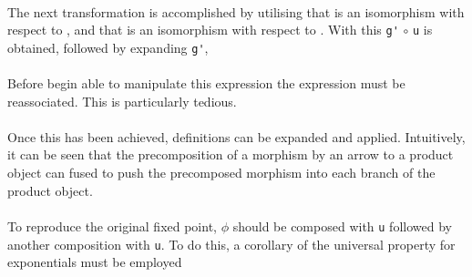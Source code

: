 \begin{AgdaMultiCode}
\\
The next transformation is accomplished by utilising that 
is an isomorphism with respect to , and that
 is an isomorphism with respect to
. With this \verb|g'| $\circ$ \verb|u| is obtained,
followed by expanding \verb|g'|, \\
\\
Before begin able to manipulate this expression the expression must be
reassociated. This is particularly tedious.\\

\\
Once this has been achieved, definitions can be expanded and applied.
Intuitively, it can be seen that the precomposition of a morphism by an arrow to
a product object can fused to push the precomposed morphism into each branch of
the product object.
\\
 \\
To reproduce the original fixed point, $\phi$ should be composed with \verb|u|
followed by another composition with \verb|u|. To do this, a corollary of the
universal property for exponentials must be employed \\

 \\


\end{AgdaMultiCode}
